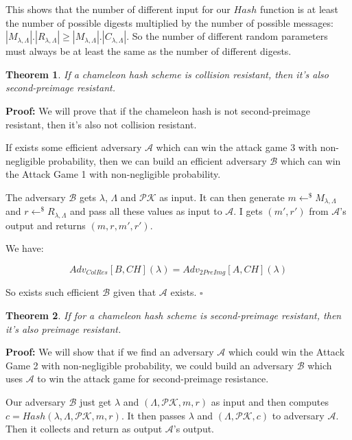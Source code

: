 \documentclass[a4paper]{article}
\newtheorem{theorem}{Theorem}
\newcommand*{\qed}{\hfill\ensuremath{\square}}
\begin{document}
    This shows that the number of different input for our $Hash$ function
    is at least the number of possible digests multiplied by the number
    of possible messages: $|M_{\lambda,\Lambda}|.|R_{\lambda,\Lambda}|
    \geq |M_{\lambda,\Lambda}|.|C_{\lambda,\Lambda}|$. So the number
    of different random parameters must always be at least the same as the
    number of different digests.
    
    \begin{theorem}
    If a chameleon hash scheme is collision resistant, then it's also
    second-preimage resistant.
    \end{theorem}
    
    \textbf{Proof:} We will prove that if the chameleon hash is not
    second-preimage resistant, then it's also not collision resistant.
    
    If exists some efficient adversary $\mathcal{A}$ which can win the
    attack game 3 with non-negligible probability, then we can build an
    efficient adversary $\mathcal{B}$ which can win the Attack Game 1 with
    non-negligible probability.
    
    The adversary $\mathcal{B}$ gets $\lambda$, $\Lambda$ and 
    $\mathcal{PK}$ as input. It can then generate 
    $m \leftarrow^{\$}M_{\lambda, \Lambda}$ and 
    $r \leftarrow^{\$}R_{\lambda,\Lambda}$
    and pass all these values as input to $\mathcal{A}$. I gets $(m', r')$
    from $\mathcal{A}$'s output and returns $(m, r, m', r')$.
    
    We have:
    
    $$
    Adv_{ColRes}[B, CH](\lambda) = Adv_{2PreImg}[A, CH](\lambda)
    $$
    
    So exists such efficient $\mathcal{B}$ given that $\mathcal{A}$ exists.
    \qed
    
    \begin{theorem}
    If for a chameleon hash scheme  is second-preimage resistant, then 
    it's also preimage resistant.
    \end{theorem}
    
    \textbf{Proof:} We will show that if we find an adversary $\mathcal{A}$
    which could win the Attack Game 2 with non-negligible probability,
    we could build an adversary $\mathcal{B}$ which uses $\mathcal{A}$
    to win the attack game for second-preimage resistance.
    
    Our adversary $\mathcal{B}$ just get $\lambda$ and 
    $(\Lambda,\mathcal{PK}, m, r)$ as input and then computes
    $c=Hash(\lambda, \Lambda, \mathcal{PK}, m, r)$. It then passes
    $\lambda$ and $(\Lambda, \mathcal{PK}, c)$ to adversary $\mathcal{A}$.
    Then it collects and return as output $\mathcal{A}$'s output.
    
\end{document}
